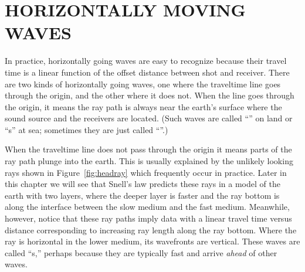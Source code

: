 \section{HORIZONTALLY MOVING WAVES}
In practice, horizontally going waves are easy to recognize
because their travel time is a linear function
of the offset distance between shot and receiver.
There are two kinds of horizontally going waves,
one where the traveltime line goes through the origin,
and the other where it does not.
When the line goes through the origin,
it means the ray path is always near the earth's surface
where the sound source and the receivers are located.
(Such waves are called ``'' on land
or ``s'' at sea;
sometimes they are just called ``''.)

\par
When the traveltime line does not pass through the origin
it means parts of the ray path plunge into the earth.
This is usually explained by
the unlikely looking rays shown in Figure~\ref{fig:headray}
which frequently occur in practice.%
Later in this chapter we will see that Snell's law
predicts these rays in a model of the earth with two layers,
where the deeper layer is faster and the ray bottom
is along the interface between the slow medium and the fast medium.
Meanwhile, however, notice that these ray paths
imply data with a linear travel time versus distance
corresponding to increasing ray length along the ray bottom.
Where the ray is horizontal in the lower medium,
its wavefronts are vertical.
These waves are called ``s,''
perhaps because they are typically fast
and arrive {\em  ahead} of other waves.

